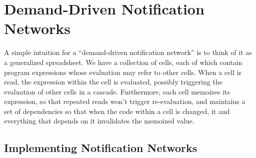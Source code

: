 \section{Demand-Driven Notification Networks}

A simple intuition for a ``demand-driven notification network'' is to
think of it as a generalized spreadsheet. We have a collection of
cells, each of which contain program expressions whose evaluation may
refer to other cells. When a cell is read, the expression within the
cell is evaluated, possibly triggering the evaluation of other cells
in a cascade. Furthermore, each cell memoizes its expression, so that
repeated reads won't trigger re-evaluation, and maintains a set of
dependencies so that when the code within a cell is changed, it and
everything that depends on it invalidates the memoized value.

\subsection{Implementing Notification Networks}

